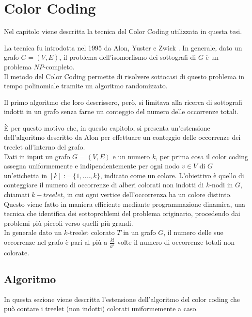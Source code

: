 \chapter{Color Coding}
\label{cap 2}
Nel capitolo viene descritta la tecnica del Color Coding utilizzata in questa tesi.

La tecnica fu introdotta nel 1995 da Alon, Yuster e Zwick \cite{alon1995color}.
In generale, dato un grafo $G = (V,E)$, il problema dell'isomorfismo dei sottografi  di $G$ \`e un problema $NP$-completo.\\
Il metodo del Color Coding permette di risolvere sottocasi di questo problema in tempo polinomiale tramite un algoritmo randomizzato.

Il primo algoritmo che loro descrissero, per\`o, si limitava alla ricerca di sottografi indotti in un grafo senza farne un conteggio del numero delle occorrenze totali.
 
\`E per questo motivo che, in questo capitolo, si presenta un'estensione dell'algoritmo descritto da Alon \cite{alon1995color,bressan2018motif} per effettuare un conteggio delle occorrenze dei treelet all'interno del grafo.\\
Dati in input un grafo $ G=(V,E) $ e un numero $ k $, per prima cosa il color coding assegna uniformemente e indipendentemente per ogni nodo $ v\in V $ di $ G $ un'etichetta in $ [k] := \{1,....,k\} $, indicato come un colore.
L'obiettivo \`e quello di conteggiare il numero di occorrenze di alberi colorati non indotti di $ k$-nodi in $ G $, chiamati $ k-treelet $, in cui ogni vertice dell'occorrenza ha un colore distinto.\\
Questo viene fatto in maniera efficiente mediante  programmazione dinamica, una tecnica che identifica dei sottoproblemi del problema originario, procedendo dai problemi pi\`u piccoli verso quelli pi\`u grandi.\\
In generale dato un $ k $-treelet colorato $ T $ in un grafo $ G $, il numero delle sue occorrenze nel grafo \`e pari al pi\`u a $ \frac{k!}{k^k} $ volte il numero di occorrenze totali non colorate.\\



\section{Algoritmo}
\label{section1}

In questa sezione viene descritta l'estensione dell'algoritmo del color coding che pu\`o contare i treelet (non indotti) colorati uniformemente a caso.

